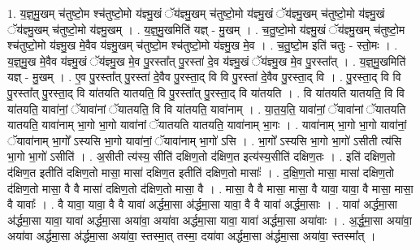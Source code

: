 \documentclass[17pt]{extarticle}
\begin{document}
1. य॒ज्ञ्॒मु॒खम् च॑तुष्टो॒म श्च॑तुष्टो॒मो य॑ज्ञ्मु॒खं ॅय॑ज्ञ्मु॒खम् च॑तुष्टो॒मो य॑ज्ञ्मु॒खं ॅय॑ज्ञ्मु॒खम् च॑तुष्टो॒मो य॑ज्ञ्मु॒खं ॅय॑ज्ञ्मु॒खम् च॑तुष्टो॒मो य॑ज्ञ्मु॒खम् । . य॒ज्ञ्॒मु॒खमिति॑ यज्ञ् - मु॒खम् । . च॒तु॒ष्टो॒मो य॑ज्ञ्मु॒खं ॅय॑ज्ञ्मु॒खम् च॑तुष्टो॒म श्च॑तुष्टो॒मो य॑ज्ञ्मु॒ख मे॒वैव य॑ज्ञ्मु॒खम् च॑तुष्टो॒म श्च॑तुष्टो॒मो य॑ज्ञ्मु॒ख मे॒व । . च॒तु॒ष्टो॒म इति॑ चतुः - स्तो॒मः । . य॒ज्ञ्॒मु॒ख मे॒वैव य॑ज्ञ्मु॒खं ॅय॑ज्ञ्मु॒ख मे॒व पु॒रस्ता᳚त् पु॒रस्ता॑ दे॒व य॑ज्ञ्मु॒खं ॅय॑ज्ञ्मु॒ख मे॒व पु॒रस्ता᳚त् । . य॒ज्ञ्॒मु॒खमिति॑ यज्ञ् - मु॒खम् । . ए॒व पु॒रस्ता᳚त् पु॒रस्ता॑ दे॒वैव पु॒रस्ता॒द् वि वि पु॒रस्ता॑ दे॒वैव पु॒रस्ता॒द् वि । . पु॒रस्ता॒द् वि वि पु॒रस्ता᳚त् पु॒रस्ता॒द् वि या॑तयति यातयति॒ वि पु॒रस्ता᳚त् पु॒रस्ता॒द् वि या॑तयति । . वि या॑तयति यातयति॒ वि वि या॑तयति॒ यावा॑नां॒ ॅयावा॑नां ॅयातयति॒ वि वि या॑तयति॒ यावा॑नाम् । . या॒त॒य॒ति॒ यावा॑नां॒ ॅयावा॑नां ॅयातयति यातयति॒ यावा॑नाम् भा॒गो भा॒गो यावा॑नां ॅयातयति यातयति॒ यावा॑नाम् भा॒गः । . यावा॑नाम् भा॒गो भा॒गो यावा॑नां॒ ॅयावा॑नाम् भा॒गो᳚ ऽस्यसि भा॒गो यावा॑नां॒ ॅयावा॑नाम् भा॒गो॑ ऽसि । . भा॒गो᳚ ऽस्यसि भा॒गो भा॒गो॑ ऽसीती त्य॑सि भा॒गो भा॒गो॑ ऽसीति॑ । . अ॒सीती त्य॑स्य॒ सीति॑ दक्षिण॒तो द॑क्षिण॒त इत्य॑स्य॒सीति॑ दक्षिण॒तः । . इति॑ दक्षिण॒तो द॑क्षिण॒त इतीति॑ दक्षिण॒तो मासा॒ मासा॑ दक्षिण॒त इतीति॑ दक्षिण॒तो मासाः᳚ । . द॒क्षि॒ण॒तो मासा॒ मासा॑ दक्षिण॒तो द॑क्षिण॒तो मासा॒ वै वै मासा॑ दक्षिण॒तो द॑क्षिण॒तो मासा॒ वै । . मासा॒ वै वै मासा॒ मासा॒ वै यावा॒ यावा॒ वै मासा॒ मासा॒ वै यावाः᳚ । . वै यावा॒ यावा॒ वै वै यावा॑ अर्द्धमा॒सा अ॑र्द्धमा॒सा यावा॒ वै वै यावा॑ अर्द्धमा॒साः । . यावा॑ अर्द्धमा॒सा अ॑र्द्धमा॒सा यावा॒ यावा॑ अर्द्धमा॒सा अया॑वा॒ अया॑वा अर्द्धमा॒सा यावा॒ यावा॑ अर्द्धमा॒सा अया॑वाः । . अ॒र्द्ध॒मा॒सा अया॑वा॒ अया॑वा अर्द्धमा॒सा अ॑र्द्धमा॒सा अया॑वा॒ स्तस्मा॒त् तस्मा॒ दया॑वा अर्द्धमा॒सा अ॑र्द्धमा॒सा अया॑वा॒ स्तस्मा᳚त् । \newline
\end{document}
